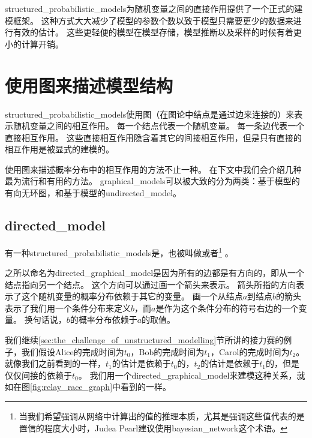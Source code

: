 \gls{structured_probabilistic_models}为随机变量之间的直接作用提供了一个正式的建模框架。
这种方式大大减少了模型的参数个数以致于模型只需要更少的数据来进行有效的估计。
这些更轻便的模型在模型存储，模型推断以及采样的时候有着更小的计算开销。











\section{使用图来描述模型结构}
\label{sec:using_graphs_to_describe_model_structure}


\gls{structured_probabilistic_models}使用图（在图论中结点是通过边来连接的）来表示随机变量之间的相互作用。
每一个结点代表一个随机变量。
每一条边代表一个直接相互作用。
这些直接相互作用隐含着其它的间接相互作用，但是只有直接的相互作用是被显式的建模的。


使用图来描述概率分布中的相互作用的方法不止一种。
在下文中我们会介绍几种最为流行和有用的方法。
\gls{graphical_models}可以被大致的分为两类：基于模型的有向无环图，和基于模型的\gls{undirected_model}。


\subsection{\gls{directed_model}}
\label{sec:directed_models}


有一种\gls{structured_probabilistic_models}是，也被叫做或者\footnote{当我们希望强调从网络中计算出的值的推理本质，尤其是强调这些值代表的是置信的程度大小时，Judea Pearl建议使用\gls{bayesian_network}这个术语。} \citep{pearl85bayesian}。


之所以命名为\gls{directed_graphical_model}是因为所有的边都是有方向的，即从一个结点指向另一个结点。
这个方向可以通过画一个箭头来表示。
箭头所指的方向表示了这个随机变量的概率分布依赖于其它的变量。
画一个从结点$a$到结点$b$的箭头表示了我们用一个条件分布来定义$b$，而$a$是作为这个条件分布的符号右边的一个变量。
换句话说，$b$的概率分布依赖于$a$的取值。


我们继续\ref{sec:the_challenge_of_unstructured_modelling}节所讲的接力赛的例子，我们假设Alice的完成时间为$t_0$，Bob的完成时间为$t_1$，Carol的完成时间为$t_2$。
就像我们之前看到的一样，$t_1$的估计是依赖于$t_0$的，$t_2$的估计是依赖于$t_1$的，但是仅仅间接的依赖于$t_0$。
我们用一个\gls{directed_graphical_model}来建模这种关系，就如在图\ref{fig:relay_race_graph}中看到的一样。


